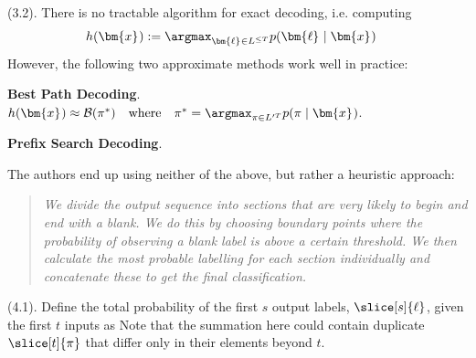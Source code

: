 \documentclass[11pt]{article}
\renewcommand\vec[2][]{\bm{#2}_{#1}}
\newcommand\myspace[1][]{\vspace{#1\bigskipamount}}
\newcommand\p{\Needspace{10\baselineskip} \noindent}
\begin{document}
\myspace
\p {} (3.2). There is no tractable algorithm for exact decoding, i.e. computing
\begin{align}
	h(\vec x) 
		&:= \argmax_{\vec\ell \in L^{\le T}} p(\vec\ell \mid \vec x)
\end{align}
However, the following two approximate methods work well in practice:
\begin{compactenum}
	\item \textbf{Best Path Decoding}. $ h(\vec x) \approx \mathcal{B}(\pi^*) \quad \text{where} \quad \pi^* = \argmax_{\pi \in L'^T} p(\pi \mid \vec x)$. 
	
	\item \textbf{Prefix Search Decoding}.
\end{compactenum}

The authors end up using neither of the above, but rather a heuristic approach:
\vspace{-0.5em}
\begin{quote}
	{\footnotesize\itshape
	We divide the output sequence into sections that are very likely to begin and end with a blank. We do this by choosing boundary points where the probability of observing a blank label is above a certain threshold. We then calculate the most probable labelling for each section individually and concatenate these to get the final classification.}
\end{quote}

\myspace
\p {} (4.1). Define the total probability of the first $s$ output labels, $\slice[s]{\ell}$, given the first $t$ inputs as 
Note that the summation here could contain duplicate $\slice[t]{\pi}$ that differ only in their elements beyond $t$. \\
\end{document}
